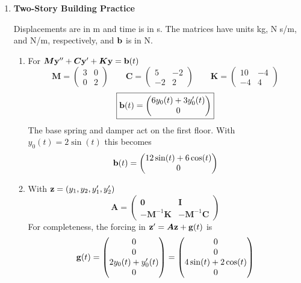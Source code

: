 \documentclass[11pt,letterpaper]{article}
\newcommand{\mat}[1]{\bm{#1}}
\begin{document}
\begin{enumerate}
\item \textbf{Two-Story Building Practice}
\par\noindent{}
\par Displacements are in m and time is in s. The matrices have units
kg, N s/m, and N/m, respectively, and $\mathbf{b}$ is in N.
\begin{enumerate}
\item For $\mat{M}\vect{y}''+\mat{C}\vect{y}'+\mat{K}\vect{y}=\vect{b}(t)$
\[
\boxed{\mat{M}=\begin{pmatrix}3&0\\0&2\end{pmatrix}}
\qquad
\boxed{\mat{C}=\begin{pmatrix}5&-2\\-2&2\end{pmatrix}}
\qquad
\boxed{\mat{K}=\begin{pmatrix}10&-4\\-4&4\end{pmatrix}}
\]
\[
\boxed{\mathbf{b}(t)=\begin{pmatrix}6y_0(t)+3y_0'(t)\\0\end{pmatrix}}
\]
The base spring and damper act on the first floor. With
$y_0(t)=2\sin(t)$ this becomes
\[
\mathbf{b}(t)=\begin{pmatrix}12\sin(t)+6\cos(t)\\0\end{pmatrix}
\]
\item With $\mathbf{z}=(y_1,y_2,y_1',y_2')$
\[
\boxed{\mat{A}=\begin{pmatrix}
\mat{0}&\mat{I}\\
-\mat{M}^{-1}\mat{K}&-\mat{M}^{-1}\mat{C}
\end{pmatrix}}
\]
For completeness, the forcing in $\vect{z}'=\mat{A}\vect{z}+\vect{g}(t)$ is
\[
\mathbf{g}(t)=\begin{pmatrix}0\\0\\2y_0(t)+y_0'(t)\\0\end{pmatrix}
=\begin{pmatrix}0\\0\\4\sin(t)+2\cos(t)\\0\end{pmatrix}
\]
\end{enumerate}
\end{enumerate}
\end{document}
